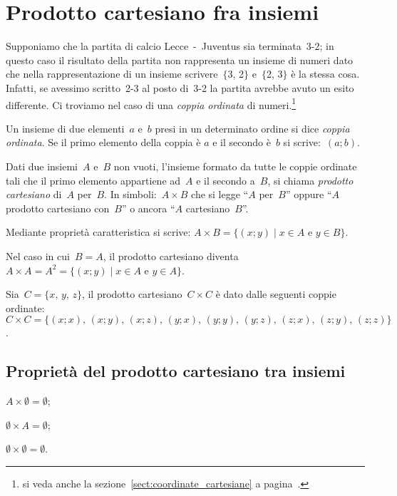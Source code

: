 \ovalbox{\risolvii \ref{ese:5.68}, \ref{ese:5.69}, \ref{ese:5.70}, \ref{ese:5.71}}

\section{Prodotto cartesiano fra insiemi}

Supponiamo che la partita di calcio Lecce~-~Juventus sia terminata~3-2; in questo caso il risultato della partita
non rappresenta un insieme di numeri dato che nella rappresentazione di un insieme scrivere~$\{$3, 2$\}$ e~$\{$2, 3$\}$
 è la stessa cosa. Infatti, se avessimo scritto~2-3 al posto di~3-2 la partita avrebbe avuto un esito
differente. Ci troviamo nel caso di una \emph{coppia ordinata} di numeri.\footnote{si veda anche la sezione~\ref{sect:coordinate_cartesiane} a pagina~\pageref{sect:coordinate_cartesiane}.}

\begin{definizione}
Un insieme di due elementi~$a$ e~$b$
presi in un determinato ordine si dice \emph{coppia ordinata}. Se il primo elemento della coppia è
$a$ e il secondo è~$b$ si scrive:~$(a;b)$.
\end{definizione}

\begin{definizione}
Dati due insiemi~$A$ e~$B$ non vuoti,
l'insieme formato da tutte le coppie ordinate tali che
il primo elemento appartiene ad~$A$ e il secondo a~$B$, si chiama
\emph{prodotto cartesiano} di~$A$ per~$B$. In simboli:~$A\times B$ che si legge ``$A$ per~$B$''
oppure ``$A$ prodotto cartesiano con~$B$'' o ancora ``$A$ cartesiano~$B$''.
\end{definizione}

Mediante proprietà caratteristica si scrive:
$A\times B=\{(x;y)\mid x\in A\text{ e }y\in B\}$.

Nel caso in cui~$B=A$, il prodotto cartesiano diventa $A\times A=A^{2}=\{(x;y)\mid x\in A\text{ e }y\in A\}$.

\begin{exrig}
 \begin{esempio}
Sia~$C=\{x\text{, }y\text{, }z\}$, il prodotto cartesiano~$C\times C$ è dato dalle
seguenti coppie ordinate:~$C\times C=\{(x;x)\text{, }(x;y)\text{, }(x;z)\text{, }(y;x)\text{, }(y;y)\text{, }(y;z)\text{, }(z;x)\text{, }(z;y)\text{, }(z;z)\}$.
 \end{esempio}
\end{exrig}

\subsection{Proprietà del prodotto cartesiano tra insiemi}
\begin{multicols}{3}
\begin{enumeratea}
 \item $A\times \emptyset =\emptyset$;
 \item $\emptyset \times A=\emptyset$;
 \item $\emptyset \times \emptyset =\emptyset$.
\end{enumeratea}
\end{multicols}

